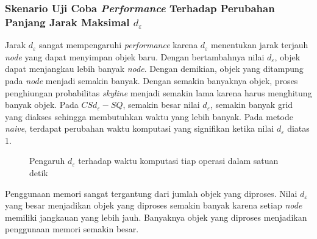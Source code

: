 \subsubsection{Skenario Uji Coba \textit{Performance} Terhadap Perubahan Panjang Jarak Maksimal $ d_\varepsilon $}
\tab Jarak $ d_\varepsilon $ sangat mempengaruhi \textit{performance} karena $ d_\varepsilon $ menentukan jarak terjauh \textit{node} yang dapat menyimpan objek baru. Dengan bertambahnya nilai $ d_\varepsilon $, objek dapat menjangkau lebih banyak \textit{node}. Dengan demikian, objek yang ditampung pada \textit{node} menjadi semakin banyak. Dengan semakin banyaknya objek, proses penghiungan probabilitas \textit{skyline} menjadi semakin lama karena harus menghitung banyak objek. Pada $ CSd_\varepsilon-SQ$, semakin besar nilai $ d_\varepsilon $, semakin banyak grid yang diakses sehingga membutuhkan waktu yang lebih banyak. Pada metode \textit{naive}, terdapat perubahan waktu komputasi yang signifikan ketika nilai $ d_\varepsilon $ diatas 1.

\begin{figure}[H]
	\caption{Pengaruh $ d_\varepsilon $ terhadap waktu komputasi tiap operasi dalam satuan detik}\label{fig:uji-d}
\end{figure}

\tab Penggunaan memori sangat tergantung dari jumlah objek yang diproses. Nilai $ d_\varepsilon $ yang besar menjadikan objek yang diproses semakin banyak karena setiap \textit{node} memiliki jangkauan yang lebih jauh. Banyaknya objek yang diproses menjadikan penggunaan memori semakin besar.

